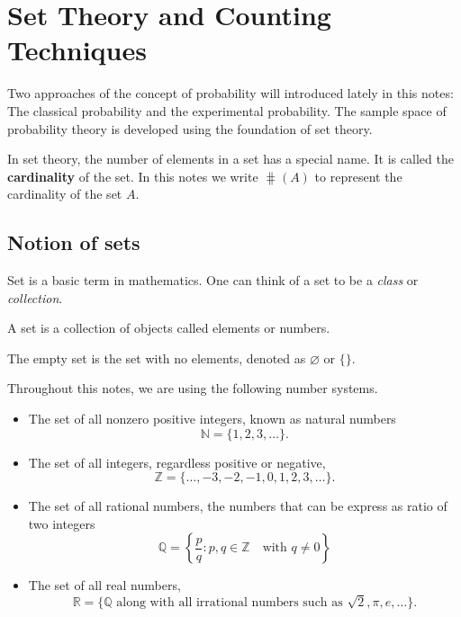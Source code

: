 \chapter{Set Theory and Counting Techniques}

Two approaches of the concept of probability will introduced lately in this notes: The classical probability 
and the experimental probability. The sample space of probability theory is developed using the 
foundation of set theory.

In set theory, the number of elements in a set has a special name. It is
 called the \textbf{cardinality} of the set. In this notes we write $\hash(A)$ to represent the 
 cardinality of the set $A$.

\section{Notion of sets}

Set is a basic term in mathematics. One can think of a set to be a \textit{class} or \textit{collection}.

\begin{definition}[Sets]
    A set is a collection of objects called elements or numbers.
\end{definition}

\begin{definition}
    The empty set is the set with no elements, denoted as $\varnothing$ or $\{\}$.
\end{definition}

\begin{example}
    Throughout this notes, we are using the following number systems.
    \begin{itemize}
        \item The set of all nonzero positive integers, known as natural numbers
        \[ \mathbb{N} = \{1, 2, 3, \ldots \}. \]
        \item The set of all integers, regardless positive or negative,
        \[
            \mathbb{Z} = \{ \ldots, -3, -2, -1, 0, 1, 2, 3, \ldots \}.
        \]
        \item The set of all rational numbers, the numbers that can be express as 
            ratio of two integers
        \[
            \mathbb{Q} = \left\{ \frac{p}{q} : p, q \in \mathbb{Z} \quad \text{with } q \neq 0 \right\}
        \]
        \item The set of all real numbers, 
        \[
            \mathbb{R} = \{ \mathbb{Q} \text{ along with all irrational numbers such as } \sqrt{2}, \pi, e, \ldots \}.
        \]
    \end{itemize}
\end{example}

